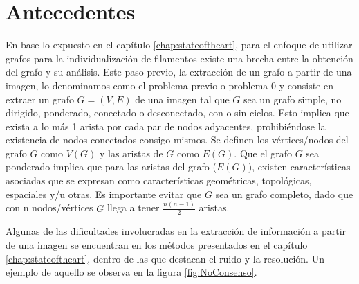 \chapter{Antecedentes}
\label{chap:cap2}


En base lo expuesto en el cap\'itulo \ref{chap:stateoftheart}, para el enfoque de utilizar grafos para la individualizaci\'on de filamentos existe una brecha entre la obtenci\'on del grafo y su an\'alisis. Este paso previo, la extracci\'on de un grafo a partir de una imagen, lo denominamos como el problema previo o problema 0 y consiste en extraer un grafo $G = (V,E)$ de una imagen tal que $G$ sea un grafo simple, no dirigido, ponderado, conectado o desconectado, con o sin ciclos. Esto implica que exista a lo m\'as 1 arista por cada par de nodos adyacentes, prohibi\'endose la existencia de nodos conectados consigo mismos. Se definen los v\'ertices/nodos del grafo $G$ como $V(G)$ y las aristas de $G$ como $E(G)$. 
Que el grafo $G$ sea ponderado implica que para las aristas del grafo ($E(G)$), existen caracter\'isticas asociadas que se expresan como caracter\'isticas geom\'etricas, topol\'ogicas, espaciales y/u otras. Es importante evitar que $G$ sea un grafo completo, dado que con n nodos/v\'ertices $G$ llega a tener $\frac{n(n-1)}{2}$ aristas.

Algunas de las dificultades involucradas en la extracci\'on de informaci\'on a partir de una imagen se encuentran en los m\'etodos presentados en el cap\'itulo \ref{chap:stateoftheart}, dentro de las que destacan el ruido y la resoluci\'on. Un ejemplo de aquello se observa en la figura \ref{fig:NoConsenso}.

